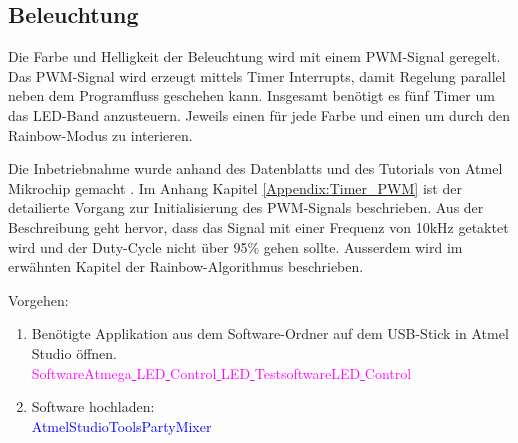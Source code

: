 \subsection{Beleuchtung}
\label{subsec:Inbetriebnahme_Beleuchtung}

Die Farbe und Helligkeit der Beleuchtung wird mit einem PWM-Signal geregelt. Das PWM-Signal wird erzeugt mittels Timer Interrupts, damit Regelung parallel neben dem Programfluss geschehen kann. Insgesamt benötigt es fünf Timer um das LED-Band anzusteuern. Jeweils einen für jede Farbe und einen um durch den Rainbow-Modus zu interieren.

Die Inbetriebnahme wurde anhand des Datenblatts und des Tutorials von Atmel Mikrochip gemacht \cite{mikrochip_makes_getting_2015}\cite{mikrochip_makes_getting_2015-1}\cite{mikrochip_makes_getting_2015-2}. Im Anhang Kapitel \ref{Appendix:Timer_PWM} ist der detailierte Vorgang zur Initialisierung des PWM-Signals beschrieben. Aus der Beschreibung geht hervor, dass das Signal mit einer Frequenz von 10kHz getaktet wird und der Duty-Cycle nicht über 95\% gehen sollte. Ausserdem wird im erwähnten Kapitel der Rainbow-Algorithmus beschrieben.

Vorgehen:

\begin{enumerate}
\item Benötigte Applikation aus dem Software-Ordner auf dem USB-Stick in Atmel Studio öffnen.\\
\textcolor{magenta}{Software\textrightarrow Atmega\underline{ }LED\underline{ }Control\underline{ }LED\underline{ }Testsoftware\textrightarrow LED\underline{ }Control}\\

\item Software hochladen:\\
\textcolor{blue}{AtmelStudio\textrightarrow Tools\textrightarrow PartyMixer}\\

\end{enumerate}